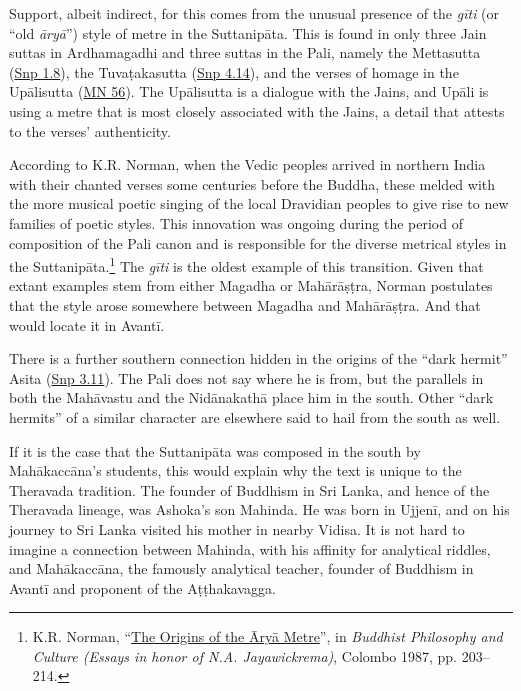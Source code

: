 \documentclass[12pt,openany]{book}%
\begin{document}
Support, albeit indirect, for this comes from the unusual presence of the \textit{\textsanskrit{gīti}} (or “old \textit{\textsanskrit{āryā}}”) style of metre in the \textsanskrit{Suttanipāta}. This is found in only three Jain suttas in Ardhamagadhi and three suttas in the Pali, namely the Mettasutta (\href{https://suttacentral.net/snp1.8/en/sujato}{Snp 1.8}), the \textsanskrit{Tuvaṭakasutta} (\href{https://suttacentral.net/snp4.14/en/sujato}{Snp 4.14}), and the verses of homage in the \textsanskrit{Upālisutta} (\href{https://suttacentral.net/mn56/en/sujato}{MN 56}). The \textsanskrit{Upālisutta} is a dialogue with the Jains, and \textsanskrit{Upāli} is using a metre that is most closely associated with the Jains, a detail that attests to the verses’ authenticity.

According to K.R. Norman, when the Vedic peoples arrived in northern India with their chanted verses some centuries before the Buddha, these melded with the more musical poetic singing of the local Dravidian peoples to give rise to new families of poetic styles. This innovation was ongoing during the period of composition of the Pali canon and is responsible for the diverse metrical styles in the \textsanskrit{Suttanipāta}.\footnote{K.R. Norman, “\href{https://www.ancient{-}buddhist{-}texts.net/Textual{-}Studies/Prosody{-}Articles/Norman{-}Arya.htm}{The Origins of the Āryā Metre}”, in \textit{Buddhist Philosophy and Culture (Essays in honor of N.A. Jayawickrema)}, Colombo 1987, pp. 203–214. } The \textit{\textsanskrit{gīti}} is the oldest example of this transition. Given that extant examples stem from either Magadha or \textsanskrit{Mahārāṣṭra}, Norman postulates that the style arose somewhere between Magadha and \textsanskrit{Mahārāṣṭra}. And that would locate it in \textsanskrit{Avantī}.

There is a further southern connection hidden in the origins of the “dark hermit” Asita (\href{https://suttacentral.net/snp3.11/en/sujato}{Snp 3.11}). The Pali does not say where he is from, but the parallels in both the \textsanskrit{Mahāvastu} and the \textsanskrit{Nidānakathā} place him in the south. Other “dark hermits” of a similar character are elsewhere said to hail from the south as well.

If it is the case that the \textsanskrit{Suttanipāta} was composed in the south by \textsanskrit{Mahākaccāna}’s students, this would explain why the text is unique to the Theravada tradition. The founder of Buddhism in Sri Lanka, and hence of the Theravada lineage, was Ashoka’s son Mahinda. He was born in \textsanskrit{Ujjenī}, and on his journey to Sri Lanka visited his mother in nearby Vidisa. It is not hard to imagine a connection between Mahinda, with his affinity for analytical riddles, and \textsanskrit{Mahākaccāna}, the famously analytical teacher, founder of Buddhism in \textsanskrit{Avantī} and proponent of the \textsanskrit{Aṭṭhakavagga}.
\end{document}
